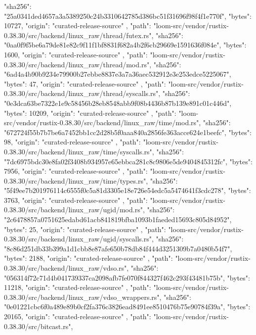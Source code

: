 {{      "sha256": "25a0341ded4657a3a5389250c24b3310642785d386bc51f31696f98f4f1e770f",
      "bytes": 10727,
      "origin": "curated-release-source"
    },
    {
      "path": "loom-src/vendor/rustix-0.38.30/src/backend/linux_raw/thread/futex.rs",
      "sha256": "0aa0f9f5be6a79de81e82c9f11f1bf8831f682a4b2f6cb29669e1591636f084e",
      "bytes": 1600,
      "origin": "curated-release-source"
    },
    {
      "path": "loom-src/vendor/rustix-0.38.30/src/backend/linux_raw/thread/mod.rs",
      "sha256": "6ad4a4b90b9234e79900b27ebbe8837e3a7a36aec532912e3e253edce5225067",
      "bytes": 47,
      "origin": "curated-release-source"
    },
    {
      "path": "loom-src/vendor/rustix-0.38.30/src/backend/linux_raw/thread/syscalls.rs",
      "sha256": "0e3dca63be7322e1e9c58456b28eb8548abb9f08b4436b87b139e891c01c446d",
      "bytes": 10209,
      "origin": "curated-release-source"
    },
    {
      "path": "loom-src/vendor/rustix-0.38.30/src/backend/linux_raw/time/mod.rs",
      "sha256": "672724f55b7b7be6a7452bb1cc2d28b5f0aaa840a2856fe363acce624e1beefc",
      "bytes": 98,
      "origin": "curated-release-source"
    },
    {
      "path": "loom-src/vendor/rustix-0.38.30/src/backend/linux_raw/time/syscalls.rs",
      "sha256": "7dc6975bdc30e8fa02f3408b934957e65ebbca281c8c9806e5de9404845312fc",
      "bytes": 7956,
      "origin": "curated-release-source"
    },
    {
      "path": "loom-src/vendor/rustix-0.38.30/src/backend/linux_raw/time/types.rs",
      "sha256": "5f49ee7b201976114c6555f0c5a81d3305e18e726e54edc5a5474641f3cdc278",
      "bytes": 3763,
      "origin": "curated-release-source"
    },
    {
      "path": "loom-src/vendor/rustix-0.38.30/src/backend/linux_raw/ugid/mod.rs",
      "sha256": "2c6478857a0751625edabd61acb841819bfba1093b1faeded15693c805d84952",
      "bytes": 25,
      "origin": "curated-release-source"
    },
    {
      "path": "loom-src/vendor/rustix-0.38.30/src/backend/linux_raw/ugid/syscalls.rs",
      "sha256": "8c86d251db33b399a1d1cbb8e87afe650b78db84f444d3251309b7a0480b54f7",
      "bytes": 2188,
      "origin": "curated-release-source"
    },
    {
      "path": "loom-src/vendor/rustix-0.38.30/src/backend/linux_raw/vdso.rs",
      "sha256": "056314f72c71d4b041739337ca2098afb7fe070f844327f462c293f43481b75b",
      "bytes": 11218,
      "origin": "curated-release-source"
    },
    {
      "path": "loom-src/vendor/rustix-0.38.30/src/backend/linux_raw/vdso_wrappers.rs",
      "sha256": "0e01221cbc6f0a489e89b0cf2fa376c3826ead8491ee8510476b75e90784f39a",
      "bytes": 20165,
      "origin": "curated-release-source"
    },
    {
      "path": "loom-src/vendor/rustix-0.38.30/src/bitcast.rs",
}}
